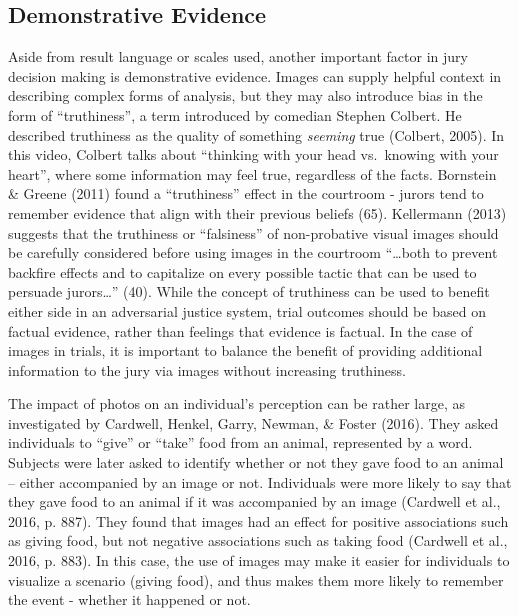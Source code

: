 \documentclass[print]{nuthesis}
\begin{document}
\hypertarget{demonstrative-evidence}{%
\subsection{Demonstrative Evidence}\label{demonstrative-evidence}}

Aside from result language or scales used, another important factor in jury decision making is demonstrative evidence.
Images can supply helpful context in describing complex forms of analysis, but they may also introduce bias in the form of ``truthiness'', a term introduced by comedian Stephen Colbert.
He described truthiness as the quality of something \emph{seeming} true (Colbert, 2005).
In this video, Colbert talks about ``thinking with your head vs.~knowing with your heart'', where some information may feel true, regardless of the facts.
Bornstein \& Greene (2011) found a ``truthiness'' effect in the courtroom - jurors tend to remember evidence that align with their previous beliefs (65).
Kellermann (2013) suggests that the truthiness or ``falsiness'' of non-probative visual images should be carefully considered before using images in the courtroom ``\ldots both to prevent backfire effects and to capitalize on every possible tactic that can be used to persuade jurors\ldots{}'' (40).
While the concept of truthiness can be used to benefit either side in an adversarial justice system, trial outcomes should be based on factual evidence, rather than feelings that evidence is factual.
In the case of images in trials, it is important to balance the benefit of providing additional information to the jury via images without increasing truthiness.

The impact of photos on an individual's perception can be rather large, as investigated by Cardwell, Henkel, Garry, Newman, \& Foster (2016).
They asked individuals to ``give'' or ``take'' food from an animal, represented by a word.
Subjects were later asked to identify whether or not they gave food to an animal -- either accompanied by an image or not.
Individuals were more likely to say that they gave food to an animal if it was accompanied by an image (Cardwell et al., 2016, p. 887).
They found that images had an effect for positive associations such as giving food, but not negative associations such as taking food (Cardwell et al., 2016, p. 883).
In this case, the use of images may make it easier for individuals to visualize a scenario (giving food), and thus makes them more likely to remember the event - whether it happened or not.
\end{document}
